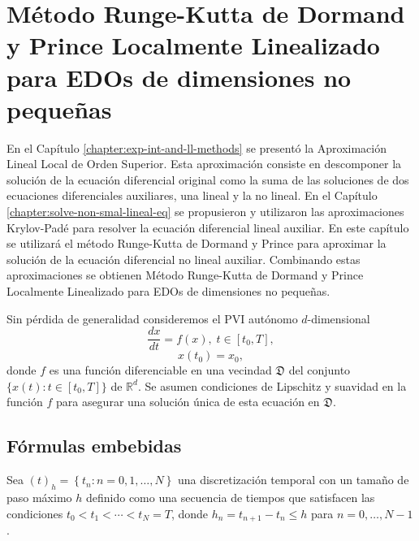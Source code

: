 \chapter{Método Runge-Kutta de Dormand y Prince Localmente Linealizado para EDOs de dimensiones no pequeñas}\label{chapter:lldp}
En el Capítulo \ref{chapter:exp-int-and-ll-methods} se presentó la Aproximación Lineal Local de Orden Superior. Esta aproximación consiste en descomponer la solución de la ecuación diferencial original como la suma de las soluciones de dos ecuaciones diferenciales auxiliares, una lineal y la no lineal. En el Capítulo \ref{chapter:solve-non-smal-lineal-eq} se propusieron y utilizaron las aproximaciones Krylov-Padé para resolver la ecuación diferencial lineal auxiliar. En este capítulo se utilizará el método Runge-Kutta de Dormand y Prince para aproximar la solución de la ecuación diferencial no lineal auxiliar. Combinando estas aproximaciones se obtienen Método Runge-Kutta de Dormand y Prince Localmente Linealizado para EDOs de dimensiones no pequeñas.

Sin pérdida de generalidad consideremos el PVI autónomo $d$-dimensional
\begin{equation}\label{syst}
\frac{dx}{dt}=f(x), \; t\in[t_0,T],\end{equation}
\begin{equation}\label{systcond}
x(t_0)=x_0,
\end{equation}donde $f$ es una función diferenciable en una vecindad
$\mathfrak{D}$ del conjunto $\{x(t):t\in [t_0,T]\}$ de $\mathbb{R}^{d}$. Se asumen condiciones de Lipschitz y suavidad en la función $f$ para asegurar una solución única de esta ecuación en $\mathfrak{D}$.

\section{Fórmulas embebidas}

Sea $\left( t\right) _{h}=\left\{ t_{n}:n=0,1,\ldots ,N\right\}$ una discretización temporal con un tamaño de paso máximo $h$ definido como una secuencia de tiempos que satisfacen las condiciones $t_{0}<t_{1}<\cdots <t_{N}=T$, donde $h_{n}=t_{n+1}-t_{n}\leq h$ para $n=0,\ldots,N-1$.

